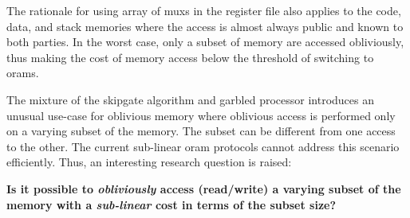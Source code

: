 The rationale for using array of \acrshort{mux}s in the register file also applies to the code, data, and stack memories where the access is almost always public and known to both parties.
In the worst case, only a subset of memory are accessed obliviously, thus making the cost of memory access below the threshold of switching to \acrshort{oram}s.

The mixture of the \gls{skipgate} algorithm and garbled processor introduces an unusual use-case for oblivious memory where oblivious access is performed only on a varying subset of the memory.
The subset can be different from one access to the other.
The current sub-linear \acrshort{oram} protocols cannot address this scenario efficiently.
Thus, an interesting research question is raised:

\textbf{Is it possible to \textit{obliviously} access (read/write) a varying subset of the memory with a \textit{sub-linear} cost in terms of the subset size?}
